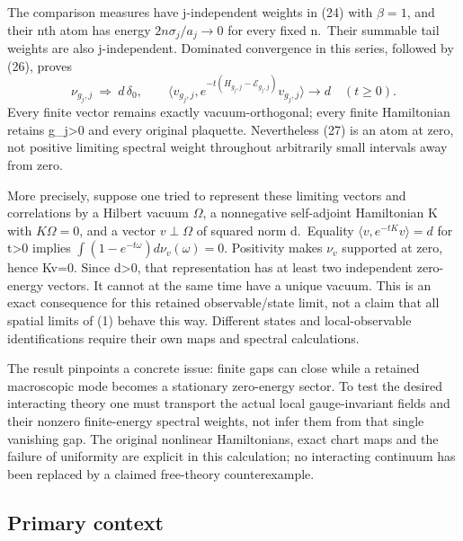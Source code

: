 \documentclass[
  11pt,
]{article}
\begin{document}
The comparison measures have j-independent weights in (24) with
\(\beta=1\), and their nth atom has energy \(2n\sigma_j/a_j\to0\) for
every fixed n.~Their summable tail weights are also j-independent.
Dominated convergence in this series, followed by (26), proves \[
 \nu_{g_j,j}\ \Longrightarrow\ d\,\delta_0,
 \qquad
 \langle v_{g_j,j},e^{-t(H_{g_j,j}-\mathcal E_{g_j,j})}v_{g_j,j}\rangle
       \longrightarrow d\quad(t\ge0).                   \tag{27}
\] Every finite vector remains exactly vacuum-orthogonal; every finite
Hamiltonian retains g\_j\textgreater0 and every original plaquette.
Nevertheless (27) is an atom at zero, not positive limiting spectral
weight throughout arbitrarily small intervals away from zero.

More precisely, suppose one tried to represent these limiting vectors
and correlations by a Hilbert vacuum \(\Omega\), a nonnegative
self-adjoint Hamiltonian K with \(K\Omega=0\), and a vector
\(v\perp\Omega\) of squared norm d.~Equality
\(\langle v,e^{-tK}v\rangle=d\) for t\textgreater0 implies
\(\int(1-e^{-t\omega})d\nu_v(\omega)=0\). Positivity makes \(\nu_v\)
supported at zero, hence Kv=0. Since d\textgreater0, that representation
has at least two independent zero-energy vectors. It cannot at the same
time have a unique vacuum. This is an exact consequence for this
retained observable/state limit, not a claim that all spatial limits of
(1) behave this way. Different states and local-observable
identifications require their own maps and spectral calculations.

The result pinpoints a concrete issue: finite gaps can close while a
retained macroscopic mode becomes a stationary zero-energy sector. To
test the desired interacting theory one must transport the actual local
gauge-invariant fields and their nonzero finite-energy spectral weights,
not infer them from that single vanishing gap. The original nonlinear
Hamiltonians, exact chart maps and the failure of uniformity are
explicit in this calculation; no interacting continuum has been replaced
by a claimed free-theory counterexample.

\subsection{Primary context}\label{weak-coupling-part-2-primary-context}
\end{document}

